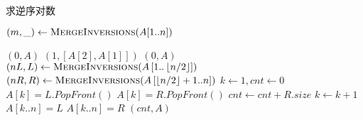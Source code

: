 \begin{questions}
    \begin{algorithm}
        \caption{求逆序对数}
        \begin{algorithmic}[1]

            \State $(m, \_) \gets \Call{MergeInversions}{A[1..n]}$
            \Statex

            \Statex {}
            \State \Return $(0, A)$
            \State \Return $(1, [A[2], A[1]])$
            \Else
            \State \Return $(0, A)$
            \EndIf
            \Else {}
            \State $(nL, L) \gets \Call{MergeInversions}{A\left[1..\left\lfloor n/2 \right\rfloor\right]}$
            \State $(nR, R) \gets \Call{MergeInversions}{A\left[\left\lfloor n/2 \right\rfloor+1 .. n\right]}$
            \State $k \gets 1, cnt \gets 0$ 
            \State $A[k] = L.PopFront()$
            \Else {}
            \State $A[k] = R.PopFront()$
            \State $cnt \gets cnt + R.size$ 
            \EndIf
            \State $k \gets k + 1$
            \EndWhile
             
            \State $A[k..n] = L$
            \State $A[k..n] = R$
            \EndIf
            \State \Return $(cnt, A)$
            \EndIf
            \EndProcedure
        \end{algorithmic}
    \end{algorithm}


\end{questions}

